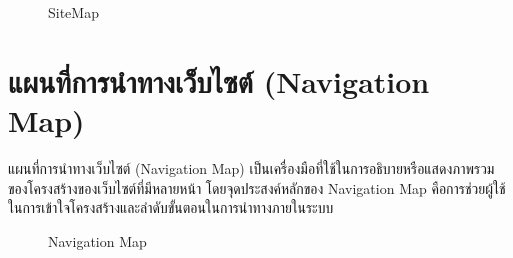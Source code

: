 \begin{figure}[H]\centering
    \setlength{\fboxrule}{0.2mm} %
    \setlength{\fboxsep}{0.5cm}
    \caption{SiteMap}\label{fig:siteMap}
\end{figure}

\section{แผนที่การนำทางเว็บไซต์ (Navigation Map)}
แผนที่การนำทางเว็บไซต์ (Navigation Map) เป็นเครื่องมือที่ใช้ในการอธิบายหรือแสดงภาพรวมของโครงสร้างของเว็บไซต์ที่มีหลายหน้า โดยจุดประสงค์หลักของ Navigation Map คือการช่วยผู้ใช้ในการเข้าใจโครงสร้างและลำดับขั้นตอนในการนำทางภายในระบบ
\begin{figure}[H]\centering
    \setlength{\fboxrule}{0.2mm} %
    \setlength{\fboxsep}{0.5cm}
    \caption{Navigation Map}\label{fig:navMap}
\end{figure}
\newpage
